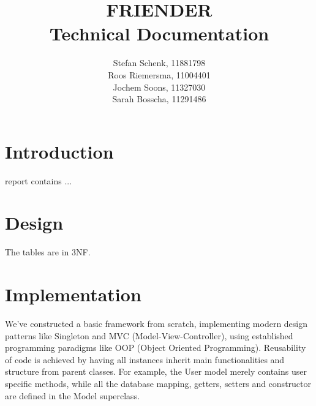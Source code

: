 \documentclass[journal]{IEEEtran}
\begin{document}
\title{FRIENDER\\
	\large{Technical Documentation}}
\author{Stefan Schenk, 11881798\\
Roos Riemersma, 11004401\\
Jochem Soons, 11327030\\
Sarah Bosscha, 11291486}


\maketitle

\section{Introduction}
 report contains ...

\section{Design}
\label{subsec:design}


The tables are in 3NF.

\section{Implementation}
\label{subsec:implementation}

We've constructed a basic framework from scratch, implementing modern design patterns like Singleton and MVC (Model-View-Controller), using established programming paradigms like OOP (Object Oriented Programming). Reusability of code is achieved by having all instances inherit main functionalities and structure from parent classes. For example, the User model merely contains user specific methods, while all the database mapping, getters, setters and constructor are defined in the Model superclass.
\end{document}
